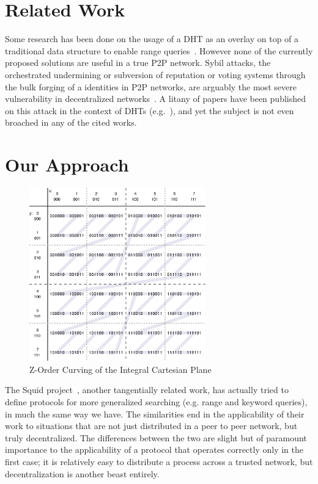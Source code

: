 \documentclass[10pt]{IEEEtran}
\begin{document}
\section{Related Work}
\par Some research has been done on the usage of a DHT as an overlay on top of a traditional data structure to enable range queries~\cite{Ramabhadran:2004tr,Desnoyers:2008uo,forestiero2009self}. However none of the currently proposed solutions are useful in a true P2P network. Sybil attacks, the orchestrated undermining or subversion of reputation or voting systems through the bulk forging of a identities in P2P networks, are arguably the most severe vulnerability in decentralized networks~\cite{Douceur:2002jr}. A litany of papers have been published on this attack in the context of DHTs (e.g.~\cite{LesniewskiLass:2010ue}), and yet the subject is not even broached in any of the cited works.


\section{Our Approach}
\begin{figure}[!t]
\centering
\includegraphics[width=3in]{ZCurve}
\caption{Z-Order Curving of the Integral Cartesian Plane~\cite{ZorderCurve:2015vo}}
\label{fig_MCode}
\end{figure}

\par The Squid project~\cite{Schmidt:2003cd}, another tangentially related work, has actually tried to define protocols for more generalized searching (e.g. range and keyword queries), in much the same way we have. The similarities end in the applicability of their work to situations that are not just distributed in a peer to peer network, but truly decentralized. The differences between the two are slight but of paramount importance to the applicability of a protocol that operates correctly only in the first case; it is relatively easy to distribute a process across a trusted network, but decentralization is another beast entirely.
\end{document}
